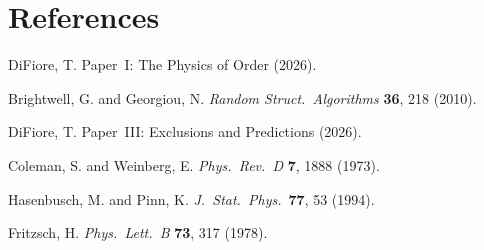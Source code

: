 \documentclass[11pt,letterpaper]{article}
\begin{document}
\section*{References}
\begin{enumerate}[label={[\arabic*]}]
  \item DiFiore, T. Paper~I: The Physics of Order (2026).
  \item Brightwell, G. and Georgiou, N. \textit{Random Struct.\
    Algorithms} \textbf{36}, 218 (2010).
  \item DiFiore, T. Paper~III: Exclusions and Predictions (2026).
  \item Coleman, S. and Weinberg, E. \textit{Phys.\ Rev.\ D}
    \textbf{7}, 1888 (1973).
  \item Hasenbusch, M. and Pinn, K. \textit{J.\ Stat.\ Phys.}\
    \textbf{77}, 53 (1994).
  \item Fritzsch, H. \textit{Phys.\ Lett.\ B} \textbf{73}, 317
    (1978).
\end{enumerate}
\end{document}
